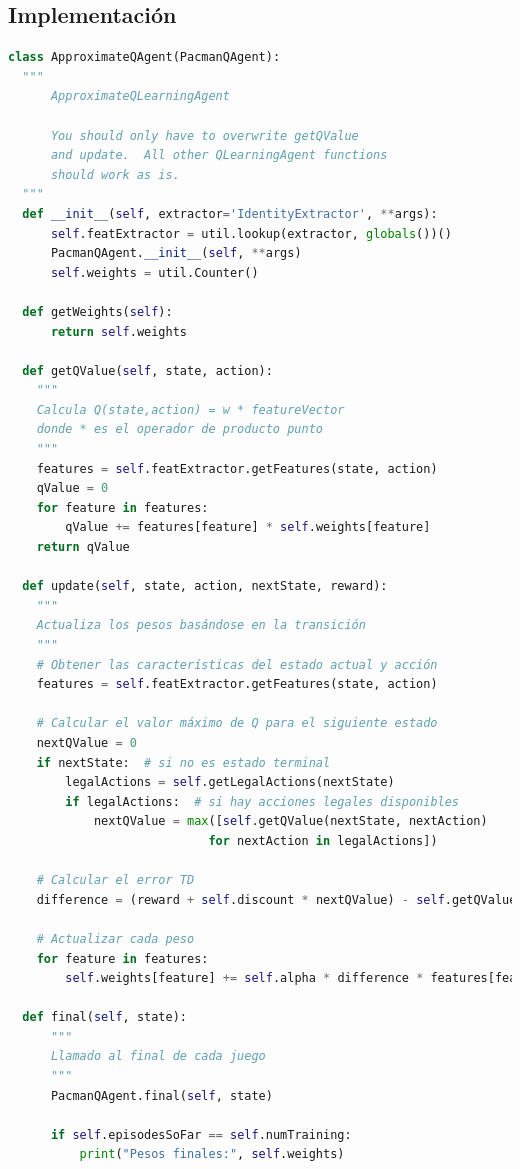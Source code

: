 \documentclass{report}
\begin{document}
      \subsection*{Implementación}
\begin{lstlisting}[language=Python, caption=Q-Learning y Pacman]
class ApproximateQAgent(PacmanQAgent):
  """
      ApproximateQLearningAgent

      You should only have to overwrite getQValue
      and update.  All other QLearningAgent functions
      should work as is.
  """
  def __init__(self, extractor='IdentityExtractor', **args):
      self.featExtractor = util.lookup(extractor, globals())()
      PacmanQAgent.__init__(self, **args)
      self.weights = util.Counter()

  def getWeights(self):
      return self.weights

  def getQValue(self, state, action):
    """
    Calcula Q(state,action) = w * featureVector
    donde * es el operador de producto punto
    """
    features = self.featExtractor.getFeatures(state, action)
    qValue = 0
    for feature in features:
        qValue += features[feature] * self.weights[feature]
    return qValue

  def update(self, state, action, nextState, reward):
    """
    Actualiza los pesos basándose en la transición
    """
    # Obtener las características del estado actual y acción
    features = self.featExtractor.getFeatures(state, action)
    
    # Calcular el valor máximo de Q para el siguiente estado
    nextQValue = 0
    if nextState:  # si no es estado terminal
        legalActions = self.getLegalActions(nextState)
        if legalActions:  # si hay acciones legales disponibles
            nextQValue = max([self.getQValue(nextState, nextAction) 
                            for nextAction in legalActions])
    
    # Calcular el error TD
    difference = (reward + self.discount * nextQValue) - self.getQValue(state, action)
    
    # Actualizar cada peso
    for feature in features:
        self.weights[feature] += self.alpha * difference * features[feature]
  
  def final(self, state):
      """
      Llamado al final de cada juego
      """
      PacmanQAgent.final(self, state)
      
      if self.episodesSoFar == self.numTraining:
          print("Pesos finales:", self.weights)

\end{lstlisting}
\end{document}
